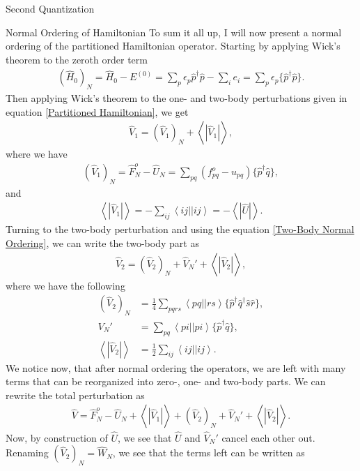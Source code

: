 \documentclass[twoside,english]{uiofysmaster}
\begin{document}
\begin{chapter}{Second Quantization}
	\begin{section}{Normal Ordering of Hamiltonian}
		To sum it all up, I will now present a normal ordering of the partitioned Hamiltonian operator. Starting by applying Wick's theorem to the zeroth order term
		\begin{align}
			(\hat H_0)_N = \hat H_0 - E^{(0)} = \sum_p \epsilon_p \hat p^\dagger \hat p - \sum_i e_i = \sum_p \epsilon_p \{\hat p^\dagger \hat p\}.
		\end{align}
		Then applying Wick's theorem to the one- and two-body perturbations given in equation \ref{Partitioned Hamiltonian}, we get 
		\begin{align}
			\hat V_1 = (\hat V_1)_N + \left< \right. | \hat V_1 | \left. \right>,
		\end{align}
		where we have 
		\begin{align}
			(\hat V_1)_N = \hat F_N^o - \hat U_N = \sum_{pq}(f_{pq}^o - u_{pq})\{ \hat p^\dagger \hat q \},
		\end{align}
		and
		\begin{align}
			\left< \right. | \hat V_1 | \left. \right> = -\sum_{ij} \left< ij || ij \right> = - \left< \right. | \hat U | \left. \right> .
		\end{align}
		Turning to the two-body perturbation and using the equation \ref{Two-Body Normal Ordering}, we can write the two-body part as
		\begin{align}
			\hat V_2 = (\hat V_2)_N + \hat V_N' + \left< \right. | \hat V_2 | \left. \right>,
		\end{align}
		where we have the following 
		\begin{align}
			(\hat V_2)_N &= \frac{1}{4} \sum_{pqrs} \left<pq||rs\right> \{ \hat p^\dagger \hat q^\dagger \hat s \hat r \}, \\
			V_N' &= \sum_{pq} \left<pi||pi\right> \{ \hat p^\dagger \hat q \}, \\
			\left< \right. | \hat V_2 | \left. \right> &= \frac{1}{2} \sum_{ij} \left<ij||ij\right>.
		\end{align}
		We notice now, that after normal ordering the operators, we are left with many terms that can be reorganized into zero-, one- and two-body parts. We can rewrite the total perturbation as
		\begin{align}
			\hat V = \hat F_N^o - \hat U_N + \left< \right. | \hat V_1 | \left. \right> + (\hat V_2)_N + \hat V_N' + \left< \right. | \hat V_2 | \left. \right>.
			\label{Total Perturbation}
		\end{align}
		Now, by construction of $\hat U$, we see that $\hat U$ and $\hat V_N'$ cancel each other out. Renaming $(\hat V_2)_N = \hat W_N$, we see that the terms left can be written as 

\end{section}
\end{chapter}
\end{document}
